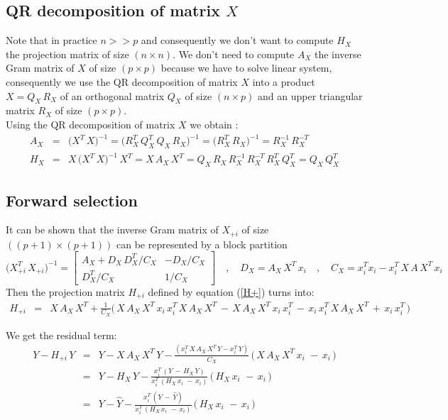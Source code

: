 \subsection{QR decomposition of matrix $X$}

Note that in practice $n >> p$ and consequently we don't want to compute $H_X$ the projection matrix of size $(n\times n)$.
We don't need to compute $A_X$ the inverse Gram matrix of $X$ of size $(p\times p)$ because we have to solve linear system, consequently
we use the QR decomposition of matrix $X$ into a product $X = Q_X\,R_X$ 
of an orthogonal matrix $Q_X$ of size $(n\times p)$ and an upper triangular matrix $R_X$ of size $(p\times p)$.\\

Using the QR decomposition of matrix $X$ we obtain :
  \begin{eqnarray}
  A_X &=& \big(X^T\,X\big)^{-1} = \big(R_X^T\,Q_X^T\,Q_X\,R_X\big)^{-1} = \big(R_X^T\,R_X\big)^{-1}= R_X^{-1}\,R_X^{-T} \\
  H_X &=& X\,\big(X^T\,X\big)^{-1}\,X^T  = X\,A_X\,X^T = Q_X\,R_X\,R_X^{-1}\,R_X^{-T}\,R_X^T\,Q_X^T =Q_X\, Q_X^T
 \end{eqnarray}
  

\subsection{Forward selection}

It can be shown that the inverse Gram matrix of $X_{+i}$ of size $((p+1)\times(p+1))$  can be represented by a block partition
\begin{equation}
\big(X^T_{+i} \,X_{+i}\big)^{-1} =
 \begin{bmatrix}
A_X + D_X\,D_X^T/C_X  & -D_X/C_X \\
D_X^T/C_X & 1/C_X
\end{bmatrix}
 \quad,\quad D_X = A_X\, X^T\,x_i
 \quad,\quad C_X = x_i^T x_i -x_i^T \,X\,A \, X^T\, x_i
 \end{equation}
Then the projection matrix $H_{+i}$ defined by equation (\ref{H+}) turns into:
 \begin{eqnarray}
H_{+i} & = &X\,A_X \, X^T + \frac{1}{C_X} \big(\,X\,A_X \, X^T\,x_i\,x_i^T\,X\,A_X \, X^T \,-\,X\,A_X \, X^T\,x_i\,x_i^T \,-\,x_i\,x_i^T \, X\,A_X \, X^T\,+\,x_i\,x_i^T \,\big)
\end{eqnarray}

We get the residual term:
 \begin{eqnarray}
Y-H_{+i}\,Y  & = & Y-X\,A_X \, X^T\,Y -\frac{(x_i^T\,X\,A_X \, X^T\,Y-x_i^T\,Y)}{C_X}\, \big(\,X\,A_X \, X^T\,x_i\, \,-\,x_i\,\big)\\
 & = & Y - H_X\,Y -\frac{x_i^T\,(Y\,-\,H_X\,Y)}{x_i^T\,(H_X\,x_i\, \,-\,x_i)}\, \big(\,H_X\,x_i\, \,-\,x_i\,\big)\\
\label{defH+Y}
 & = & Y - \hat{Y} -\frac{x_i^T\,(Y\,-\,\hat{Y})}{x_i^T\,(H_X\,x_i\, \,-\,x_i)}\, \big(\,H_X\,x_i\, \,-\,x_i\,\big)
\end{eqnarray}

